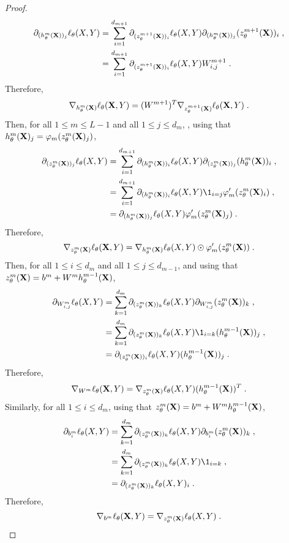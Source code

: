 \begin{proof}
\begin{align*}
\partial_{(h_{\theta}^m(\mathbf{X}))_j}\ell_{\theta}(X,Y) &=  \sum_{i=1}^{d_{m+1}} \partial_{(z_{\theta}^{m+1}(\mathbf{X}))_i}\ell_{\theta}(X,Y)\partial_{(h_{\theta}^m(\mathbf{X}))_j}(z_{\theta}^{m+1}(\mathbf{X}))_i\;,\\
&=  \sum_{i=1}^{d_{m+1}} \partial_{(z_{\theta}^{m+1}(\mathbf{X}))_i}\ell_{\theta}(X,Y)W^{m+1}_{i,j}\;.
\end{align*}
Therefore,
$$
\nabla_{h_{\theta}^m(\mathbf{X})} \ell_{\theta}(\mathbf{X},Y) = (W^{m+1})^T\nabla_{z_{\theta}^{m+1}(\mathbf{X})} \ell_{\theta}(\mathbf{X},Y) \;.
$$
Then, for all $1\leqslant m \leqslant L-1$ and all $1\leqslant j \leqslant d_m$, ,  using that $h_{\theta}^{m}(\mathbf{X})_j =\varphi_m(z_{\theta}^{m}(\mathbf{X})_j)$,
\begin{align*}
\partial_{(z_{\theta}^m(\bX))_j}\ell_{\theta}(X,Y) &=  \sum_{i=1}^{d_{m+1}} \partial_{(h_{\theta}^m(\bX))_i}\ell_{\theta}(X,Y)\partial_{(z_{\theta}^m(\bX))_j}(h_{\theta}^m(\bX))_i\eqsp,\\
&=  \sum_{i=1}^{d_{m+1}} \partial_{(h_{\theta}^m(\bX))_i}\ell_{\theta}(X,Y) \1_{i=j}\varphi_m'(z_{\theta}^{m}(\bX)_i)\eqsp,\\
&= \partial_{(h_{\theta}^m(\bX))_j}\ell_{\theta}(X,Y) \varphi_m'(z_{\theta}^{m}(\bX)_j)\eqsp.
\end{align*}
Therefore,
$$
\nabla_{z_{\theta}^m(\mathbf{X})} \ell_{\theta}(\mathbf{X},Y) = \nabla_{h_{\theta}^m(\mathbf{X})}\ell_{\theta}(X,Y) \odot \varphi_m'(z_{\theta}^{m}(\mathbf{X}))\;.
$$
Then, for all $1\leqslant i\leqslant d_m$ and all $1\leqslant j \leqslant d_{m-1}$, and using that $z_{\theta}^m(\mathbf{X}) = b^m + W^mh_{\theta}^{m-1}(\mathbf{X})$,
\begin{align*}
\partial_{W^m_{i,j}}\ell_{\theta}(X,Y) &=  \sum_{k=1}^{d_m} \partial_{(z_{\theta}^m(\bX))_k}\ell_{\theta}(X,Y)\partial_{W^m_{i,j}}(z_{\theta}^m(\bX))_k\eqsp,\\
&=  \sum_{k=1}^{d_m} \partial_{(z_{\theta}^m(\bX))_k}\ell_{\theta}(X,Y)\1_{i=k}(h_{\theta}^{m-1}(\bX))_j\eqsp,\\
&=  \partial_{(z_{\theta}^m(\bX))_i}\ell_{\theta}(X,Y)(h_{\theta}^{m-1}(\bX))_j\eqsp.
\end{align*}
Therefore,
$$
\nabla_{W^m} \ell_{\theta}(\mathbf{X},Y) = \nabla_{z_{\theta}^m(\mathbf{X})}\ell_{\theta}(X,Y)(h_{\theta}^{m-1}(\mathbf{X}))^T\;.
$$
Similarly, for all $1\leqslant i\leqslant d_m$,  using that $z_{\theta}^m(\mathbf{X}) = b^m + W^mh_{\theta}^{m-1}(\mathbf{X})$,
\begin{align*}
\partial_{b^m_{i}}\ell_{\theta}(X,Y) &=  \sum_{k=1}^{d_m} \partial_{(z_{\theta}^m(\bX))_k}\ell_{\theta}(X,Y)\partial_{b^m_{i}}(z_{\theta}^m(\bX))_k\eqsp,\\
&=  \sum_{k=1}^{d_m} \partial_{(z_{\theta}^m(\bX))_k}\ell_{\theta}(X,Y)\1_{i=k}\eqsp,\\
&=  \partial_{(z_{\theta}^m(\bX))_k}\ell_{\theta}(X,Y)_i\eqsp.
\end{align*}
Therefore,
$$
\nabla_{b^m} \ell_{\theta}(\mathbf{X},Y) =  \nabla_{z_{\theta}^m(\mathbf{X})}\ell_{\theta}(X,Y)\;.
$$
\end{proof}
